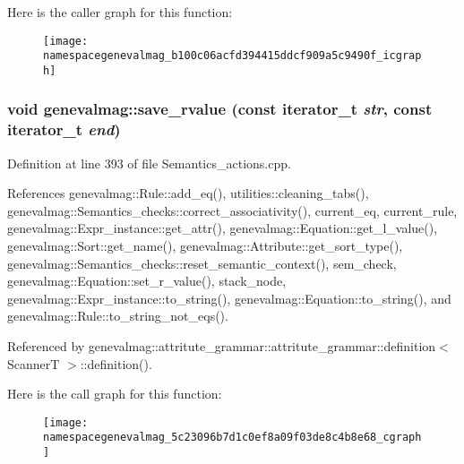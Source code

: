 Here is the caller graph for this function:\nopagebreak
\begin{figure}[H]
\begin{center}
\leavevmode
\texttt{[image: namespacegenevalmag\_b100c06acfd394415ddcf909a5c9490f\_icgraph]}
\end{center}
\end{figure}
\hypertarget{namespacegenevalmag_5c23096b7d1c0ef8a09f03de8c4b8e68}{
\subsubsection[{save\_\-rvalue}]{\setlength{\rightskip}{0pt plus 5cm}void genevalmag::save\_\-rvalue (const iterator\_\-t {\em str}, \/  const iterator\_\-t {\em end})}}
\label{namespacegenevalmag_5c23096b7d1c0ef8a09f03de8c4b8e68}




Definition at line 393 of file Semantics\_\-actions.cpp.

References genevalmag::Rule::add\_\-eq(), utilities::cleaning\_\-tabs(), genevalmag::Semantics\_\-checks::correct\_\-associativity(), current\_\-eq, current\_\-rule, genevalmag::Expr\_\-instance::get\_\-attr(), genevalmag::Equation::get\_\-l\_\-value(), genevalmag::Sort::get\_\-name(), genevalmag::Attribute::get\_\-sort\_\-type(), genevalmag::Semantics\_\-checks::reset\_\-semantic\_\-context(), sem\_\-check, genevalmag::Equation::set\_\-r\_\-value(), stack\_\-node, genevalmag::Expr\_\-instance::to\_\-string(), genevalmag::Equation::to\_\-string(), and genevalmag::Rule::to\_\-string\_\-not\_\-eqs().

Referenced by genevalmag::attritute\_\-grammar::attritute\_\-grammar::definition$<$ ScannerT $>$::definition().

Here is the call graph for this function:\nopagebreak
\begin{figure}[H]
\begin{center}
\leavevmode
\texttt{[image: namespacegenevalmag\_5c23096b7d1c0ef8a09f03de8c4b8e68\_cgraph]}
\end{center}
\end{figure}


